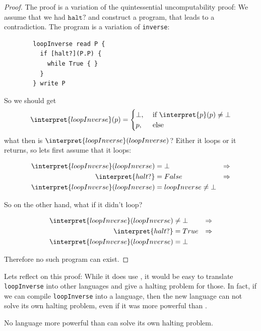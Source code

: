 \begin{proof}
	The proof is a variation of the quintessential uncomputability proof: We 
	assume that we had $\mathtt{halt?}$ and construct a program, that leads to a
	contradiction. The program is a variation of {\tt inverse}:

	\begin{verbatim}
		loopInverse read P {
		  if [halt?](P.P) {
		    while True { }
		  }
		} write P
	\end{verbatim}

	So we should get
	\begin{equation*}
	 \interpret{loopInverse}(p) = \begin{cases}
			\bot, &\text{ if }\interpret{p}(p) \neq \bot\\
			p,& \text{ else} 
		\end{cases}
	\end{equation*}
	what then is $\interpret{loopInverse}(loopInverse)$? Either it loops or it 
	returns, so lets first assume that it loops:

	\begin{align*}
		\interpret{loopInverse}(loopInverse) &= \bot &\Rightarrow \\ 
		\interpret{halt?} &= False &\Rightarrow \\ 
		\interpret{loopInverse}(loopInverse) &= loopInverse\neq \bot
	\end{align*}

	So on the other hand, what if it didn't loop?

	\begin{align*}
		\interpret{loopInverse}(loopInverse) &\neq\bot &\Rightarrow \\
		\interpret{halt?} &= True & \Rightarrow \\
		\interpret{loopInverse}(loopInverse) &= \bot
	\end{align*}

	Therefore no such \WHILE program can exist.
\end{proof}

Lets reflect on this proof: While it does use \WHILE, it would be easy to 
translate {\tt loopInverse} into other languages and give a halting 
problem for those. In fact, if we can compile {\tt loopInverse} into a 
language, then the new language can not solve its own halting problem, even 
if it was more powerful than \WHILE.

\begin{corrolary}
	No language more powerful than \WHILE can solve its own halting problem.
\end{corrolary}


